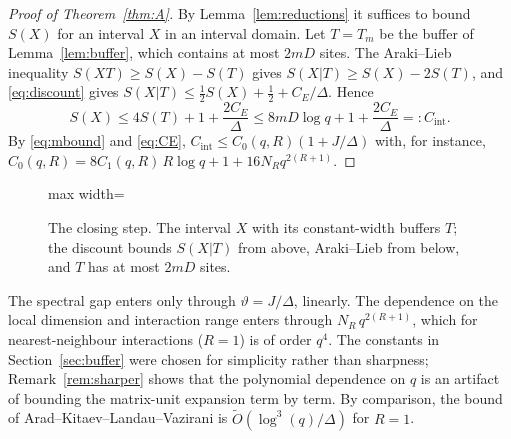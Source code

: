 \precisely
\begin{proof}[Proof of Theorem~\ref{thm:A}]
By Lemma~\ref{lem:reductions} it suffices to bound $S(X)$ for an interval
$X$ in an interval domain. Let $T=T_m$ be the buffer of
Lemma~\ref{lem:buffer}, which contains at most $2mD$ sites. The Araki--Lieb
inequality $S(XT)\ge S(X)-S(T)$ gives $S(X|T)\ge S(X)-2S(T)$, and
\eqref{eq:discount} gives $S(X|T)\le\frac12S(X)+\frac12+C_E/\Delta$. Hence
\begin{equation}\label{eq:final}
 S(X)\le 4S(T)+1+\frac{2C_E}{\Delta}\le 8mD\log q+1+\frac{2C_E}{\Delta}=:C_{\mathrm{int}}.
\end{equation}
By \eqref{eq:mbound} and \eqref{eq:CE}, $C_{\mathrm{int}}\le C_0(q,R)(1+J/\Delta)$
with, for instance,
$C_0(q,R)=8C_1(q,R)\,R\log q+1+16N_Rq^{2(R+1)}$.
\end{proof}

\begin{figure}[t]
\centering
\begin{adjustbox}{max width=\linewidth}

\end{adjustbox}
\caption{The closing step. The interval $X$ with its constant-width buffers $T$; the discount bounds $S(X|T)$ from above, Araki–Lieb from below, and $T$ has at most $2mD$ sites.}\label{fig:closing}
\end{figure}

\begin{remark}\label{rem:constants}
The spectral gap enters only through $\vartheta=J/\Delta$, linearly. The
dependence on the local dimension and interaction range enters through
$N_R\,q^{2(R+1)}$, which for nearest-neighbour interactions ($R=1$) is of
order $q^4$. The constants in Section~\ref{sec:buffer} were chosen for
simplicity rather than sharpness; Remark~\ref{rem:sharper} shows that the
polynomial dependence on $q$ is an artifact of bounding the matrix-unit
expansion term by term. By comparison, the bound of
Arad--Kitaev--Landau--Vazirani \cite{AKLV} is $\tilde O(\log^3(q)/\Delta)$
for $R=1$.
\end{remark}

